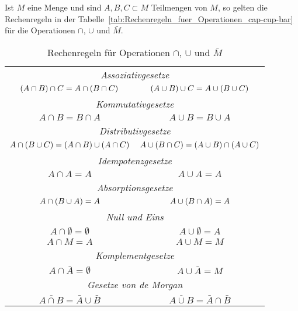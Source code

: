 Ist $M$ eine Menge und sind $A, B, C \subset M$ Teilmengen von $M$, so gelten die Rechenregeln in der Tabelle~\vref{tab:Rechenregeln_fuer_Operationen_cap-cup-bar} für die Operationen $\cap$, $\cup$ und $\bar{M}$.
\begin{table}[htb]
\centering
\begin{tabular}{cc}
\toprule
\multicolumn{2}{c}{\emph{Assoziativgesetze}}\\
$\left(A \cap B\right) \cap C = A \cap \left(B \cap C\right)$ & $\left(A \cup B\right) \cup C = A \cup \left(B \cup C\right)$\\
\midrule

\multicolumn{2}{c}{\emph{Kommutativgesetze}}\\
$A \cap B = B \cap A$ & $A \cup B = B \cup A$\\
\midrule

\multicolumn{2}{c}{\emph{Distributivgesetze}}\\
$A \cap \left(B \cup C\right) = \left(A \cap B\right) \cup \left(A \cap C\right)$ & $A \cup \left(B \cap C\right) = \left(A \cup B\right) \cap \left(A \cup C\right)$\\
\midrule

\multicolumn{2}{c}{\emph{Idempotenzgesetze}}\\
$A \cap A = A$ & $A \cup A = A$\\
\midrule

\multicolumn{2}{c}{\emph{Absorptionsgesetze}}\\
$A \cap \left(B \cup A\right) = A$ & $A \cup \left(B \cap A\right) = A$\\
\midrule

\multicolumn{2}{c}{\emph{Null und Eins}}\\
$A \cap \emptyset = \emptyset$ & $A \cup \emptyset = A$\\
$A \cap M = A$ & $A \cup M = M$\\
\midrule

\multicolumn{2}{c}{\emph{Komplementgesetze}}\\
$A \cap \bar{A} = \emptyset$ & $A \cup \bar{A} = M$\\
\midrule

\multicolumn{2}{c}{\emph{Gesetze von de Morgan}}\\
$\overline{A \cap B} = \bar{A} \cup \bar{B}$ & $\overline{A \cup B} = \bar{A} \cap \bar{B}$\\
\bottomrule
\end{tabular}
\label{tab:Rechenregeln_fuer_Operationen_cap-cup-bar}
\caption{Rechenregeln für Operationen $\cap$, $\cup$ und $\bar{M}$}
\end{table}

